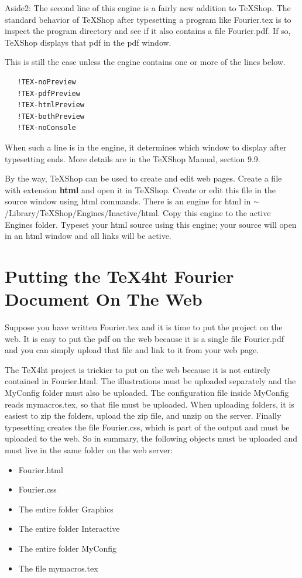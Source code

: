 \documentclass[11pt, oneside]{article}   	%
\begin{document}
Aside2: The second line of this engine is a fairly new addition to TeXShop. The standard behavior of TeXShop after typesetting a program like Fourier.tex is to inspect the program directory and see if it also contains a file Fourier.pdf. If so, TeXShop displays that pdf in the pdf window.

This is still the case unless the engine contains one or more of the lines below.
\begin{verbatim}
   !TEX-noPreview
   !TEX-pdfPreview
   !TEX-htmlPreview
   !TEX-bothPreview
   !TEX-noConsole
\end{verbatim}
When such a line is in the engine, it determines which window to display after typesetting ends.
More details are in the TeXShop Manual, section 9.9.

By the way, TeXShop can be used to create and edit web pages. Create a file with extension {\bf html} and
open it in TeXShop. Create or edit this file in the source window using html commands. There is an engine for html in  $\sim$/Library/TeXShop/Engines/Inactive/html. Copy this engine to the
active Engines folder. Typeset your html source using this engine; your source will
open in an html window and all links will be active.



\section{Putting the TeX4ht Fourier Document On The Web}

Suppose you have written Fourier.tex and it is time to put the project on the web. It is
easy to put the pdf on the web because it is a single file Fourier.pdf and you can simply
upload that file and link to it from your web page. 

The TeX4ht project is  trickier to put on the web because it is not entirely contained
in Fourier.html. The illustrations must be uploaded separately and the MyConfig folder must also be uploaded. The configuration file inside MyConfig reads mymacros.tex, so that file must be uploaded. When uploading folders, it is easiest to zip the folders, upload the zip
file, and unzip on the server. Finally typesetting creates the file Fourier.css, which is part
of the output and must be uploaded to the web. So in summary, the following objects must
be uploaded and must live in the same folder on the web server:
\begin{itemize}
\item Fourier.html
\item Fourier.css
\item The entire folder Graphics
\item The entire folder Interactive
\item The entire folder MyConfig
\item The file mymacros.tex
\end{itemize}
\end{document}
